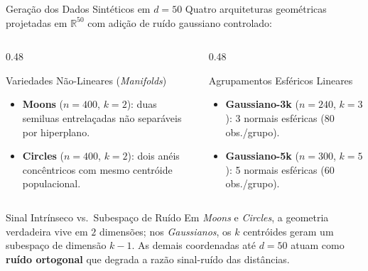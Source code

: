 \documentclass[aspectratio=169,11pt]{beamer}
\begin{document}
\begin{frame}{Geração dos Dados Sintéticos em $d = 50$}
  Quatro arquiteturas geométricas projetadas em $\mathbb{R}^{50}$ com adição de
  ruído gaussiano controlado:

  \vspace{0.4em}
  \begin{columns}[T]
    \begin{column}{0.48\textwidth}
      \begin{block}{Variedades Não-Lineares (\textit{Manifolds})}
        \small
        \begin{itemize}
          \item \textbf{Moons} ($n = 400$, $k = 2$): duas semiluas entrelaçadas
                não separáveis por hiperplano.
          \item \textbf{Circles} ($n = 400$, $k = 2$): dois anéis concêntricos
                com mesmo centróide populacional.
        \end{itemize}
      \end{block}
    \end{column}
    \begin{column}{0.48\textwidth}
      \begin{block}{Agrupamentos Esféricos Lineares}
        \small
        \begin{itemize}
          \item \textbf{Gaussiano-3k} ($n = 240$, $k = 3$): 3 normais esféricas
                ($80$ obs./grupo).
          \item \textbf{Gaussiano-5k} ($n = 300$, $k = 5$): 5 normais esféricas
                ($60$ obs./grupo).
        \end{itemize}
      \end{block}
    \end{column}
  \end{columns}

  \vspace{0.5em}
  \begin{block}{Sinal Intrínseco vs.\ Subespaço de Ruído}
    \small
    Em \textit{Moons} e \textit{Circles}, a geometria verdadeira vive em $2$
    dimensões; nos \textit{Gaussianos}, os $k$ centróides geram um subespaço de
    dimensão $k-1$. As demais coordenadas até $d = 50$ atuam como \textbf{ruído
    ortogonal} que degrada a razão sinal-ruído das distâncias.
  \end{block}
\end{frame}
\end{document}
